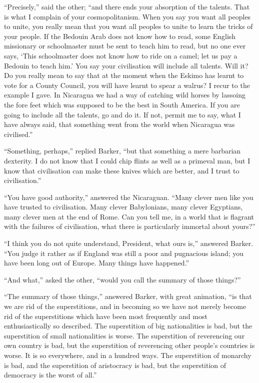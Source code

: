 \documentclass{book}
\begin{document}
“Precisely,” said the other; “and there ends your absorption of the talents. That is what I complain of your cosmopolitanism. When you say you want all peoples to unite, you really mean that you want all peoples to unite to learn the tricks of your people. If the Bedouin Arab does not know how to read, some English missionary or schoolmaster must be sent to teach him to read, but no one ever says, ‘This schoolmaster does not know how to ride on a camel; let us pay a Bedouin to teach him.’ You say your civilisation will include all talents. Will it? Do you really mean to say that at the moment when the Eskimo has learnt to vote for a County Council, you will have learnt to spear a walrus? I recur to the example I gave. In Nicaragua we had a way of catching wild horses by lassoing the fore feet which was supposed to be the best in South America. If you are going to include all the talents, go and do it. If not, permit me to say, what I have always said, that something went from the world when Nicaragua was civilised.”

“Something, perhaps,” replied Barker, “but that something a mere barbarian dexterity. I do not know that I could chip flints as well as a primeval man, but I know that civilisation can make these knives which are better, and I trust to civilisation.”

“You have good authority,” answered the Nicaraguan. “Many clever men like you have trusted to civilisation. Many clever Babylonians, many clever Egyptians, many clever men at the end of Rome. Can you tell me, in a world that is flagrant with the failures of civilisation, what there is particularly immortal about yours?”

“I think you do not quite understand, President, what ours is,” answered Barker. “You judge it rather as if England was still a poor and pugnacious island; you have been long out of Europe. Many things have happened.”

“And what,” asked the other, “would you call the summary of those things?”

“The summary of those things,” answered Barker, with great animation, “is that we are rid of the superstitions, and in becoming so we have not merely become rid of the superstitions which have been most frequently and most enthusiastically so described. The superstition of big nationalities is bad, but the superstition of small nationalities is worse. The superstition of reverencing our own country is bad, but the superstition of reverencing other people’s countries is worse. It is so everywhere, and in a hundred ways. The superstition of monarchy is bad, and the superstition of aristocracy is bad, but the superstition of democracy is the worst of all.”
\end{document}
